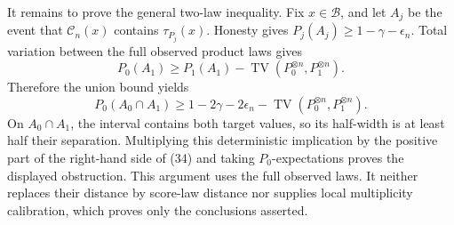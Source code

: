 It remains to prove the general two-law inequality.  Fix \(x\in\mathcal B\), and let \(A_j\) be the event that \(\mathcal C_n(x)\) contains \(\tau_{P_j}(x)\).  Honesty gives \(P_j(A_j)\ge1-\gamma-\epsilon_n\).  Total variation between the full observed product laws gives
\[
 P_0(A_1)\ge P_1(A_1)-\operatorname{TV}(P_0^{\otimes n},P_1^{\otimes n}).
\]
Therefore the union bound yields
\[
 P_0(A_0\cap A_1)\ge1-2\gamma-2\epsilon_n-
 \operatorname{TV}(P_0^{\otimes n},P_1^{\otimes n}). \tag{34}
\]
On \(A_0\cap A_1\), the interval contains both target values, so its half-width is at least half their separation.  Multiplying this deterministic implication by the positive part of the right-hand side of (34) and taking \(P_0\)-expectations proves the displayed obstruction.  This argument uses the full observed laws.  It neither replaces their distance by score-law distance nor supplies local multiplicity calibration, which proves only the conclusions asserted.